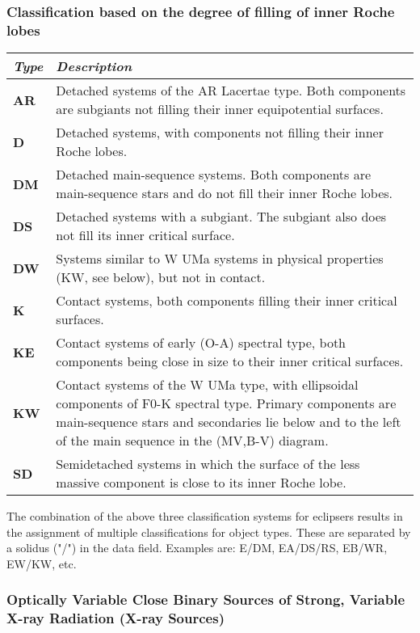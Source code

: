 \subsubsection{Classification based on the degree of filling of inner Roche lobes}
\label{classification-based-on-the-degree-of-filling-of-inner-roche-lobes}

\begin{longtabu} to \textwidth {l|X}\toprule
\emph{Type} & \emph{Description}\\\midrule
\textbf{AR} & Detached systems of the AR Lacertae type. Both components
              are subgiants not filling their inner equipotential surfaces.\\\midrule
\textbf{D}  & Detached systems, with components not filling their inner Roche lobes.\\\midrule
\textbf{DM} & Detached main-sequence systems. Both components are
              main-sequence stars and do not fill their inner Roche lobes.\\\midrule
\textbf{DS} & Detached systems with a subgiant. The subgiant also does
              not fill its inner critical surface.\\\midrule
\textbf{DW} & Systems similar to W UMa systems in physical properties (KW, see below), but not in contact.\\\midrule
\textbf{K}  & Contact systems, both components filling their inner critical surfaces.\\\midrule
\textbf{KE} & Contact systems of early (O-A) spectral type, both
              components being close in size to their inner critical surfaces.\\\midrule
\textbf{KW} & Contact systems of the W UMa type, with ellipsoidal
              components of F0-K spectral type. Primary components are main-sequence
              stars and secondaries lie below and to the left of the main sequence in the (MV,B-V) diagram.\\\midrule
\textbf{SD} & Semidetached systems in which the surface of the less
              massive component is close to its inner Roche lobe.\\\bottomrule
\end{longtabu}

The combination of the above three classification systems for eclipsers
results in the assignment of multiple classifications for object types.
These are separated by a solidus ("/") in the data field. Examples are:
E/DM, EA/DS/RS, EB/WR, EW/KW, etc.

\subsubsection{Optically Variable Close Binary Sources of Strong, Variable X-ray Radiation (X-ray Sources)}
\label{optically-variable-close-binary-sources-of-strong-variable-x-ray-radiation-x-ray-sources}


